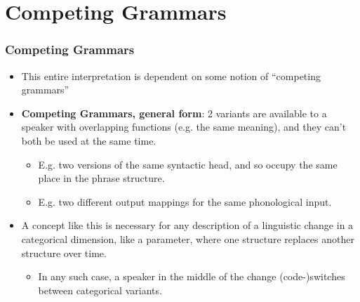 \documentclass[hyperref={pdfpagelabels=false}]{beamer}
\begin{document}
\section{Competing Grammars}
\begin{frame}
\frametitle{Competing Grammars}
\begin{itemize}
	\item This entire interpretation is dependent on some notion of ``competing grammars'' \citep{kroch1989, kroch1994}
	\item \textbf{Competing Grammars, general form}: 2 variants are available to a speaker with overlapping functions (e.g. the same meaning), and they can't both be used at the same time.
		\begin{itemize}
			\item E.g. two versions of the same syntactic head, and so occupy the same place in the phrase structure. 
			\item E.g. two different output mappings for the same phonological input.
		\end{itemize}
	\item A concept like this is necessary for any description of a linguistic change in a categorical dimension, like a parameter, where one structure replaces another structure over time. 
		\begin{itemize} 
			\item In any such case, a speaker in the middle of the change (code-)switches between categorical variants.
		\end{itemize} 
\end{itemize}
\end{frame}
%
%
\end{document}
